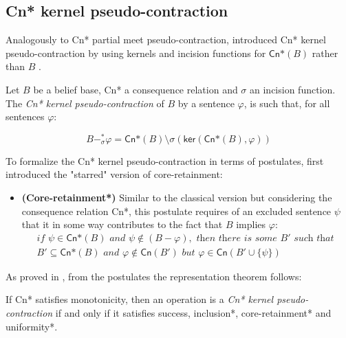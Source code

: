\subsection{\textsf{Cn*} kernel pseudo-contraction}
Analogously to \textsf{Cn*} partial meet pseudo-contraction, \citeauthor{Matos2021} introduced \textsf{Cn*} kernel pseudo-contraction by using kernels and incision functions for $\textsf{Cn*}(B)$ rather than $B$ \citep{Matos2021}.
\begin{definition}
    Let $B$ be a belief base, \textsf{Cn*} a consequence relation and $\sigma$ an incision function. The \textit{\textsf{Cn*} kernel pseudo-contraction} of $B$ by a sentence $\varphi$, is such that, for all sentences $\varphi$:

    $$B -_{\sigma}^{*} \varphi = \textsf{Cn*}(B) \setminus \sigma(\textsf{ker}(\textsf{Cn*}(B), \varphi))$$
\end{definition}

To formalize the \textsf{Cn*} kernel pseudo-contraction in terms of postulates, \citeauthor{Matos2021} first introduced the "starred" version of core-retainment:

\begin{itemize}
    \item[] \textbf{(Core-retainment*)} Similar to the classical version but considering the consequence relation \textsf{Cn*}, this postulate requires of an excluded sentence $\psi$ that it in some way contributes to the fact that $B$ implies $\varphi$:
    \begin{equation*}
        \begin{split}
            \textit{if } \psi \in \textsf{Cn*}(B) \textit{ and } \psi \notin (B - \varphi), \textit{ then there is some } B' \textit{ such that } \\
            B' \subseteq \textsf{Cn*}(B) \textit{ and } \varphi \notin \textsf{Cn}(B') \textit{ but } \varphi \in \textsf{Cn}(B' \cup \{ \psi \}) 
        \end{split}
    \end{equation*}
\end{itemize}

As proved in \citet{Matos2021}, from the postulates the representation theorem follows:

\begin{theorem}
    If \textsf{Cn*} satisfies monotonicity, then an operation is a \textit{\textsf{Cn*} kernel pseudo-contraction} if and only if it satisfies success, inclusion*, core-retainment* and uniformity*.
\end{theorem}


